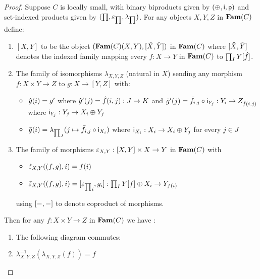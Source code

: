 \begin{proof}
Suppose $C$ is locally small, with binary biproducts given by $(\oplus,\mathsf{i},\mathsf{p})$ and set-indexed products
given by $(\prod,\varepsilon_{\prod},\lambda_{\prod})$. For any objects $X, Y, Z$ in $\mathbf{Fam}(C)$ define:

\begin{enumerate}
\item $[X, Y]$ to be the object $(\mathbf{Fam}(C)(X,Y),[\hat{X}, \hat{Y}])$ in $\mathbf{Fam}(C)$ where $[\hat{X}, \hat{Y}]$
denotes the indexed family mapping every $f: X \to Y$ in $\mathbf{Fam}(C)$ to $\prod_{I}Y[\hat{f}]$.
\item The family of isomorphisms $\lambda_{X,Y,Z}$ (natural in $X$) sending any morphism $f: X \times Y \to Z$
to $g: X \to [Y, Z]$ with:
\begin{itemize}
\item $\hat{g}(i) = g'$ where $\hat{g}'(j) = \hat{f}(i, j): J \to K$ and $\bar{g}'(j) = \bar{f}_{i,j} \circ
\mathsf{i}_{Y_j}: Y_i \to Z_{\hat{f}(i, j)}$ where $\mathsf{i}_{Y_j}: Y_j \to X_i \oplus Y_j$
\item $\bar{g}(i) = \lambda_{\prod_{J}}(j \mapsto \bar{f}_{i, j} \circ \mathsf{i}_{X_i})$ where $\mathsf{i}_{X_i}: X_i
\to X_i \oplus Y_j$ for every $j \in J$
\end{itemize}
\item The family of morphisms $\varepsilon_{X,Y}: [X, Y] \times X \to Y$ in $\mathbf{Fam}(C)$ with
\begin{itemize}
\item $\hat{\varepsilon}_{X,Y}((f, g), i) = f(i)$
\item $\bar{\varepsilon}_{X,Y}((f, g), i) = [{\varepsilon_{\prod}}_i, g_i]: \prod_{I}Y[f] \oplus X_i \to Y_{f(i)}$
\end{itemize}
using $[-, -]$ to denote coproduct of morphisms.
\end{enumerate}
Then for any $f: X \times Y \to Z$ in $\mathbf{Fam}(C)$ we have :
\begin{enumerate}
\item The following diagram commutes:

\begin{center}
\end{center}

\item $\lambda^{-1}_{X,Y,Z}(\lambda_{X,Y,Z}(f)) = f$
\end{enumerate}
\end{proof}
